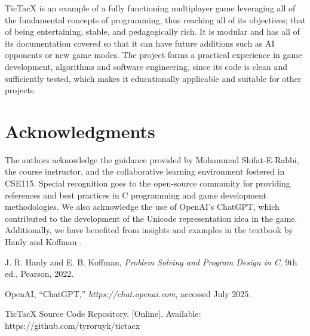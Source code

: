 \documentclass[11pt,a4paper,twocolumn]{article}
\begin{document}
TicTacX is an example of a fully functioning multiplayer game leveraging all of the fundamental concepts of programming, thus reaching all of its objectives; that of being entertaining, stable, and pedagogically rich. It is modular and has all of its documentation covered so that it can have future additions such as AI opponents or new game modes. The project forms a practical experience in game development, algorithms and software engineering, since its code is clean and sufficiently tested, which makes it educationally applicable and suitable for other projects.

\section{Acknowledgments}

The authors acknowledge the guidance provided by Mohammad Shifat-E-Rabbi, the course instructor, and the collaborative learning environment fostered in CSE115. Special recognition goes to the open-source community for providing references and best practices in C programming and game development methodologies. We also acknowledge the use of OpenAI's ChatGPT, which contributed to the development of the Unicode representation idea in the game. Additionally, we have benefited from insights and examples in the textbook by Hanly and Koffman \cite{hanly2022}.

\begin{thebibliography}{9}

J. R. Hanly and E. B. Koffman, \textit{Problem Solving and Program Design in C}, 9th ed., Pearson, 2022.

OpenAI, ``ChatGPT,'' \textit{https://chat.openai.com}, accessed July 2025.

TicTacX Source Code Repository. [Online]. Available: https://github.com/tyroruyk/tictacx

\end{thebibliography}
\end{document}
